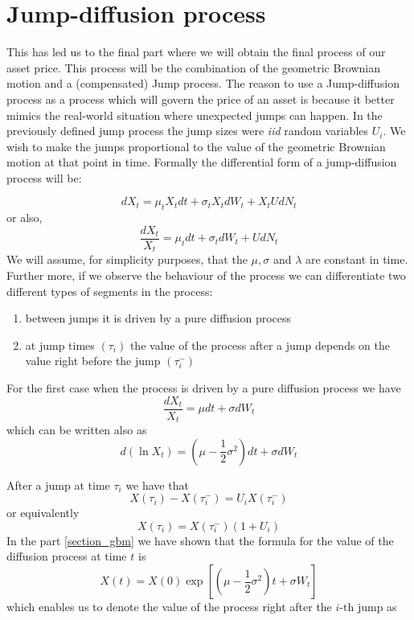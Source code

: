 \documentclass[times, utf8, diplomski]{fer}
\begin{document}
	\section{Jump-diffusion process}
	This has led us to the final part where we will obtain the final process of our asset price. This process will be the combination of the geometric Brownian motion and a (compensated) Jump process. The reason to use a Jump-diffusion process as a process which will govern the price of an asset is because it better mimics the real-world situation where unexpected jumps can happen. In the previously defined jump process the jump sizes were \textit{iid} random variables $U_i$. We wish to make the jumps proportional to the value of the geometric Brownian motion at that point in time. Formally the differential form of a jump-diffusion process will be:

	\begin{equation} \label{eqn_jd}
		dX_t = \mu_tX_tdt + \sigma_tX_tdW_t + X_tUdN_t
	\end{equation} or also,
	\begin{equation} \label{eqn_jd_frac}
		\frac{dX_t}{X_t} = \mu_tdt + \sigma_tdW_t + UdN_t
	\end{equation} 
	We will assume, for simplicity purposes, that the $\mu, \sigma$ and $\lambda$ are constant in time. Further more, if we observe the behaviour of the process we can differentiate two different types of segments in the process:
	\begin{enumerate}
		\item between jumps it is driven by a pure diffusion process
		\item at jump times $(\tau_i)$ the value of the process after a jump depends on the value right before the jump $(\tau_i^-)$
	\end{enumerate}

	\noindent For the first case when the process is driven by a pure diffusion process we have
	\begin{equation}
		\frac{dX_t}{X_t} = \mu dt + \sigma dW_t
	\end{equation} which can be written also as 
	\begin{equation}
		d(\ln X_t) = (\mu - \frac{1}{2}\sigma^2)dt + \sigma dW_t
	\end{equation}

	\noindent After a jump at time $\tau_i$ we have that
	\begin{equation*}
		X(\tau_i) - X(\tau_i^-) = U_i X(\tau_i^-)
	\end{equation*}
	\noindent or equivalently
	\begin{equation}
		X(\tau_i) = X(\tau_i^-)(1 + U_i)
	\end{equation}
	\noindent In the part \ref{section_gbm} we have shown that the formula for the value of the diffusion process at time $t$ is $$X(t) = X(0)\exp\left[ (\mu-\frac{1}{2}\sigma^2)t + \sigma W_t \right]$$ which enables us to denote the value of the process right after the $i$-th jump as 
\end{document}
